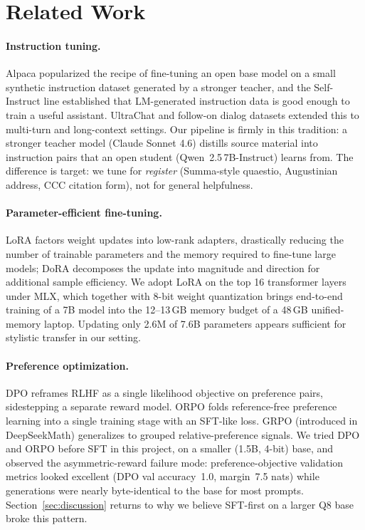 \section{Related Work}
\label{sec:related}

\paragraph{Instruction tuning.} Alpaca \cite{alpaca} popularized the
recipe of fine-tuning an open base model on a small synthetic instruction
dataset generated by a stronger teacher, and the Self-Instruct line
\cite{selfinstruct} established that LM-generated instruction data is good
enough to train a useful assistant. UltraChat and follow-on dialog datasets
extended this to multi-turn and long-context settings. Our pipeline is
firmly in this tradition: a stronger teacher model (Claude Sonnet 4.6)
distills source material into instruction pairs that an open student
(Qwen~2.5\,7B-Instruct) learns from. The difference is target: we tune for
\emph{register} (Summa-style quaestio, Augustinian address, CCC citation
form), not for general helpfulness.

\paragraph{Parameter-efficient fine-tuning.} LoRA \cite{lora} factors weight
updates into low-rank adapters, drastically reducing the number of
trainable parameters and the memory required to fine-tune large models;
DoRA decomposes the update into magnitude and direction for additional
sample efficiency. We adopt LoRA on the top 16 transformer layers under
MLX, which together with 8-bit weight quantization brings end-to-end
training of a 7B model into the 12--13\,GB memory budget of a 48\,GB
unified-memory laptop. Updating only 2.6M of 7.6B parameters appears
sufficient for stylistic transfer in our setting.

\paragraph{Preference optimization.} DPO \cite{rafailov2023dpo} reframes
RLHF \cite{ouyang2022instructgpt} as a single likelihood objective on
preference pairs, sidestepping a separate reward model. ORPO \cite{orpo}
folds reference-free preference learning into a single training stage with
an SFT-like loss. GRPO \cite{grpo} (introduced in DeepSeekMath) generalizes
to grouped relative-preference signals. We tried DPO and ORPO before SFT
in this project, on a smaller (1.5B, 4-bit) base, and observed the
asymmetric-reward failure mode: preference-objective validation metrics
looked excellent (DPO val accuracy~1.0, margin~7.5 nats) while generations
were nearly byte-identical to the base for most prompts.
Section~\ref{sec:discussion} returns to why we believe SFT-first on a
larger Q8 base broke this pattern.

